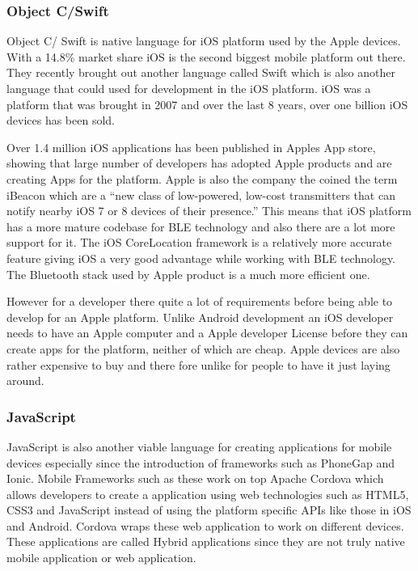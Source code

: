 \subsubsection{Object C/Swift}

Object C/ Swift is native language for iOS platform used by the Apple
devices. With a 14.8\% market share iOS is the second biggest mobile
platform out there\cite{market-share}. They recently brought out
another language called Swift which is also another language that
could used for development in the iOS platform. iOS was a platform
that was brought in 2007 and over the last 8 years, over one billion
iOS devices has been sold\cite{oneBios}.

Over 1.4 million iOS applications has been published in Apples App
store, showing that large number of developers has adopted Apple products
and are creating Apps for the platform. Apple is also the company
the coined the term iBeacon which are a ``new class of low-powered,
low-cost transmitters that can notify nearby iOS 7 or 8 devices of
their presence.'' This means that iOS platform has a more mature
codebase for BLE technology and also there are a lot more support
for it. The iOS CoreLocation\cite{corelocation} framework is a relatively
more accurate feature giving iOS a very good advantage while working
with BLE technology. The Bluetooth stack used by Apple product is
a much more efficient one.

However for a developer there quite a lot of requirements before being
able to develop for an Apple platform. Unlike Android development
an iOS developer needs to have an Apple computer and a Apple developer
License before they can create apps for the platform, neither of which
are cheap. Apple devices are also rather expensive to buy and there
fore unlike for people to have it just laying around.


\subsubsection{JavaScript}

JavaScript is also another viable language for creating applications
for mobile devices especially since the introduction of frameworks
such as PhoneGap\cite{phonegap} and Ionic\cite{ionic}. Mobile Frameworks
such as these work on top Apache Cordova which allows developers to
create a application using web technologies such as HTML5, CSS3 and
JavaScript instead of using the platform specific APIs like those
in iOS and Android. Cordova wraps these web application to work on
different devices. These applications are called Hybrid applications
since they are not truly native mobile application or web application.

